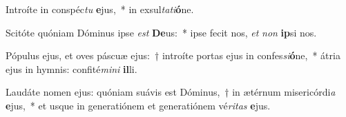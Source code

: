 \item Introíte in conspéc\textit{tu} \textbf{e}jus,~* in exsul\textit{ta}\textit{ti}\textbf{ó}ne.
\item Scitóte quóniam Dóminus ipse \textit{est} \textbf{De}us:~* ipse fecit nos, \textit{et} \textit{non} \textbf{ip}si nos.
\item Pópulus ejus, et oves páscuæ ejus:~† introíte portas ejus in confes\textit{si}\textbf{ó}ne,~* átria ejus in hymnis: confité\textit{mi}\textit{ni} \textbf{il}li.
\item Laudáte nomen ejus: quóniam suávis est Dóminus,~† in ætérnum misericórdi\textit{a} \textbf{e}jus,~* et usque in generatiónem et generatiónem vé\textit{ri}\textit{tas} \textbf{e}jus.
